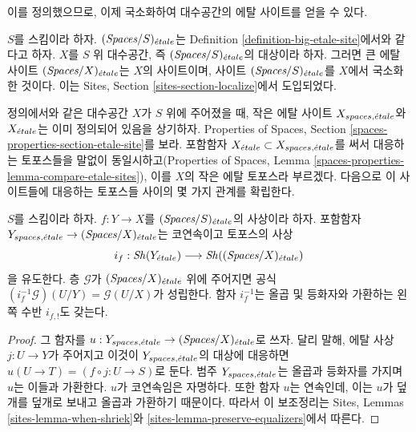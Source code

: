 \noindent
이를 정의했으므로, 이제 국소화하여 대수공간의 에탈 사이트를 얻을 수 있다.

\begin{definition}
\label{definition-big-small-etale}
$S$를 스킴이라 하자. $(\textit{Spaces}/S)_{\acute{e}tale}$는 Definition
\ref{definition-big-etale-site}에서와 같다고 하자. $X$를 $S$ 위
대수공간, 즉 $(\textit{Spaces}/S)_{\acute{e}tale}$의 대상이라 하자. 그러면 큰
에탈 사이트 {\it $(\textit{Spaces}/X)_{\acute{e}tale}$}는 $X$의 사이트이며,
사이트 $(\textit{Spaces}/S)_{\acute{e}tale}$를 $X$에서 국소화한 것이다. 이는 Sites,
Section \ref{sites-section-localize}에서 도입되었다.
\end{definition}

\noindent
정의에서와 같은 대수공간 $X$가 $S$ 위에 주어졌을 때, 작은 에탈 사이트
$X_{spaces, {\acute{e}tale}}$와 $X_{\acute{e}tale}$는 이미 정의되어 있음을 상기하자.
Properties of Spaces, Section
\ref{spaces-properties-section-etale-site}를 보라. 포함함자
$X_{\acute{e}tale} \subset X_{spaces, {\acute{e}tale}}$를 써서 대응하는 토포스들을 말없이
동일시하고(Properties of Spaces, Lemma
\ref{spaces-properties-lemma-compare-etale-sites}), 이를 $X$의 작은 에탈
토포스라 부르겠다. 다음으로 이 사이트들에 대응하는 토포스들 사이의 몇
가지 관계를 확립한다.

\begin{lemma}
\label{lemma-put-in-T-etale}
$S$를 스킴이라 하자. $f : Y \to X$를 $(\textit{Spaces}/S)_{\acute{e}tale}$의
사상이라 하자. 포함함자
$Y_{spaces, {\acute{e}tale}} \to (\textit{Spaces}/X)_{\acute{e}tale}$는 코연속이고 토포스의
사상
$$
i_f :
\mathop{\mathit{Sh}}\nolimits(Y_{\acute{e}tale})
\longrightarrow
\mathop{\mathit{Sh}}\nolimits((\textit{Spaces}/X)_{\acute{e}tale})
$$
을 유도한다. 층 $\mathcal{G}$가 $(\textit{Spaces}/X)_{\acute{e}tale}$ 위에 주어지면
공식 $(i_f^{-1}\mathcal{G})(U/Y) = \mathcal{G}(U/X)$가 성립한다.
함자 $i_f^{-1}$는 올곱 및 등화자와 가환하는 왼쪽 수반 $i_{f, !}$도 갖는다.
\end{lemma}

\begin{proof}
그 함자를 $u : Y_{spaces, {\acute{e}tale}} \to (\textit{Spaces}/X)_{\acute{e}tale}$로 쓰자.
달리 말해, 에탈 사상 $j : U \to Y$가 주어지고 이것이
$Y_{spaces, {\acute{e}tale}}$의 대상에 대응하면
$u(U \to T) = (f \circ j : U \to S)$로 둔다.
범주 $Y_{spaces, {\acute{e}tale}}$는 올곱과 등화자를 가지며 $u$는 이들과 가환한다.
$u$가 코연속임은 자명하다.
또한 함자 $u$는 연속인데, 이는 $u$가 덮개를 덮개로 보내고 올곱과
가환하기 때문이다. 따라서 이
보조정리는 Sites, Lemmas \ref{sites-lemma-when-shriek}와
\ref{sites-lemma-preserve-equalizers}에서 따른다.
\end{proof}

